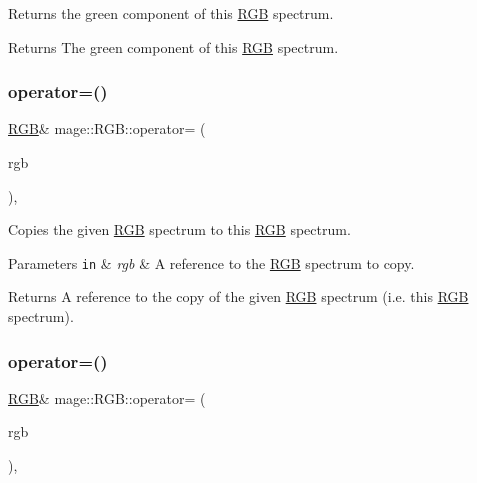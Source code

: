 Returns the green component of this \mbox{\hyperlink{structmage_1_1_r_g_b}{R\+GB}} spectrum.

\begin{DoxyReturn}{Returns}
The green component of this \mbox{\hyperlink{structmage_1_1_r_g_b}{R\+GB}} spectrum. 
\end{DoxyReturn}
\mbox{\label{structmage_1_1_r_g_b_a10fd47397bb4a691c951d44abfb77d7c}} 
\subsubsection{\texorpdfstring{operator=()}{operator=()}\hspace{0.1cm}{\footnotesize\ttfamily [1/2]}}
{\footnotesize\ttfamily \mbox{\hyperlink{structmage_1_1_r_g_b}{R\+GB}}\& mage\+::\+R\+G\+B\+::operator= (\begin{DoxyParamCaption}\item[{const \mbox{\hyperlink{structmage_1_1_r_g_b}{R\+GB}} \&}]{rgb }\end{DoxyParamCaption})\hspace{0.3cm}{\ttfamily [default]}, {\ttfamily [noexcept]}}

Copies the given \mbox{\hyperlink{structmage_1_1_r_g_b}{R\+GB}} spectrum to this \mbox{\hyperlink{structmage_1_1_r_g_b}{R\+GB}} spectrum.


\begin{DoxyParams}[1]{Parameters}
\mbox{\tt in}  & {\em rgb} & A reference to the \mbox{\hyperlink{structmage_1_1_r_g_b}{R\+GB}} spectrum to copy. \\
\hline
\end{DoxyParams}
\begin{DoxyReturn}{Returns}
A reference to the copy of the given \mbox{\hyperlink{structmage_1_1_r_g_b}{R\+GB}} spectrum (i.\+e. this \mbox{\hyperlink{structmage_1_1_r_g_b}{R\+GB}} spectrum). 
\end{DoxyReturn}
\mbox{\label{structmage_1_1_r_g_b_add3b5995774c634d6e32af4d1cd6bfb3}} 
\subsubsection{\texorpdfstring{operator=()}{operator=()}\hspace{0.1cm}{\footnotesize\ttfamily [2/2]}}
{\footnotesize\ttfamily \mbox{\hyperlink{structmage_1_1_r_g_b}{R\+GB}}\& mage\+::\+R\+G\+B\+::operator= (\begin{DoxyParamCaption}\item[{\mbox{\hyperlink{structmage_1_1_r_g_b}{R\+GB}} \&\&}]{rgb }\end{DoxyParamCaption})\hspace{0.3cm}{\ttfamily [default]}, {\ttfamily [noexcept]}}


